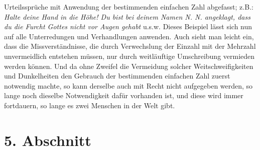 Urteilssprüche mit Anwendung der bestimmenden einfachen Zahl abgefasst; z.B.:
\textit{Halte deine Hand in die Höhe! Du bist bei deinem Namen N. N. angeklagt,
dass du
die Furcht Gottes nicht vor Augen gehabt} u.s.w. Dieses Beispiel lässt sich nun
auf alle Unterredungen und Verhandlungen anwenden. Auch sieht man leicht ein,
dass die Missverständnisse, die durch Verwechslung der Einzahl mit der Mehrzahl
unvermeidlich entstehen müssen, nur durch weitläuftige Umschreibung vermieden
werden können. Und da ohne Zweifel die Vermeidung solcher Weitschweifigkeiten
und Dunkelheiten den Gebrauch der bestimmenden einfachen Zahl zuerst notwendig
machte, so kann derselbe auch mit Recht nicht aufgegeben werden, so lange noch
dieselbe Notwendigkeit dafür vorhanden ist, und diese wird immer fortdauern, so
lange es zwei Menschen in der Welt gibt.

\section{5. Abschnitt} \label{kap10_ab5}

